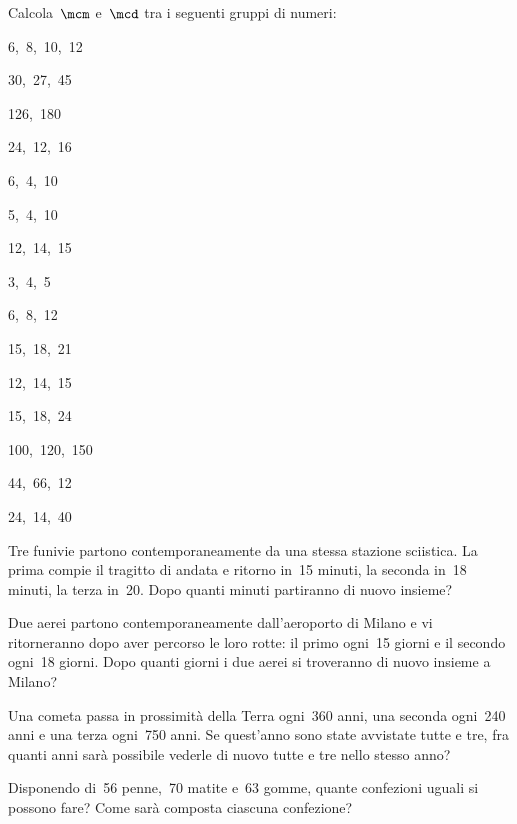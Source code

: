 \begin{esercizio}[\Ast]
\label{ese:1.22}
Calcola~$\mcm$ e~$\mcd$ tra i seguenti gruppi di numeri:
\begin{multicols}{3}
 \begin{enumeratea}
 \item 6,~8,~10,~12
 \item 30,~27,~45
 \item 126,~180
 \item 24,~12,~16
 \item 6,~4,~10
 \item 5,~4,~10
 \item 12,~14,~15
 \item 3,~4,~5
 \item 6,~8,~12
 \item 15,~18,~21
 \item 12,~14,~15
 \item 15,~18,~24
 \item 100,~120,~150
 \item 44,~66,~12
 \item 24,~14,~40
 \end{enumeratea}
\end{multicols}
\end{esercizio}

\begin{multicols}{2}
\begin{esercizio}[\Ast]
\label{ese:1.23}
 Tre funivie partono contemporaneamente da una stessa stazione sciistica. La prima compie il tragitto di
andata e ritorno in~15 minuti, la seconda in~18 minuti, la terza in~20. Dopo quanti minuti partiranno di nuovo
insieme?
\end{esercizio}

\begin{esercizio}[\Ast]
\label{ese:1.24}
 Due aerei partono contemporaneamente dall'aeroporto di Milano e vi ritorneranno dopo aver
percorso le loro rotte: il primo ogni~15 giorni e il secondo ogni~18 giorni. Dopo quanti giorni i due
aerei si troveranno di nuovo insieme a Milano?
\end{esercizio}

\begin{esercizio}[\Ast]
\label{ese:1.25}
 Una cometa passa in prossimità della Terra ogni~360 anni, una seconda ogni~240 anni e una terza ogni~750 anni.
 Se quest'anno sono state avvistate tutte e tre, fra quanti anni sarà possibile vederle di nuovo tutte e
tre nello stesso anno?
\end{esercizio}

\begin{esercizio}[\Ast]
\label{ese:1.26}
 Disponendo di~56 penne,~70 matite e~63 gomme, quante confezioni uguali si possono fare? Come sarà
composta ciascuna confezione?
\end{esercizio}
\end{multicols}

